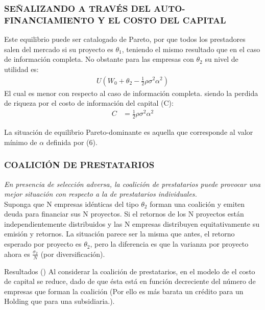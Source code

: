 \documentclass[10pt, xcolor=table, x11names]{beamer}
\begin{document}
\begin{frame}
    \frametitle{{\normalsize SEÑALIZANDO A TRAVÉS DEL AUTO-FINANCIAMIENTO Y EL COSTO DEL CAPITAL} {}}
        
    Este equilibrio puede ser catalogado de Pareto, por que todos los prestadores salen del mercado si su proyecto es $\theta_{1} $, teniendo el mismo resultado que en el caso de información completa. No obstante para las empresas con $\theta_{2} $ su nivel de utilidad es:
    \begin{align}
    U(W_{0}+\theta_{2}-\frac{1}{2}\rho \sigma^{2} \alpha^{2})\nonumber
    \end{align} 
    El cual es menor con respecto al caso de información completa. siendo la perdida de riqueza por el costo de información del capital (C):
    \begin{align}
    C&=\frac{1}{2}\rho \sigma^{2} \alpha^{2}\nonumber
    \end{align} 
    
    La situación de equilibrio Pareto-dominante es aquella que corresponde al valor mínimo de $\alpha$ definida por (6).
    
\end{frame}

\begin{frame}
    \frametitle{{\normalsize COALICIÓN DE PRESTATARIOS} {}}
    
    \textit{En presencia de selección adversa, la coalición de prestatarios puede provocar una mejor situación con respecto a la de prestatarios individuales.}\\
    
    Suponga que N empresas idénticas del tipo $\theta_{2}$ forman una coalición  y emiten deuda para financiar sus N proyectos. Si el retornos de los N proyectos están independientemente distribuidos y las N empresas distribuyen equitativamente su emisión y retornos. La situación parece ser la misma que antes, el retorno esperado por proyecto es $\theta_{2}$, pero la diferencia es que la varianza por proyecto ahora es $\frac{\sigma_{2}}{N}$ (por diversificación).\\
    
    \begin{block} {Resultados (\cite{Diamond1984})}
     Al considerar la coalición de prestatarios, en el modelo de \cite{Leland77} el costo de capital se reduce, dado de que ésta está en función decreciente del número de empresas que forman la coalición (Por ello es más barata un crédito para un Holding que para una subsidiaria.).     
    \end{block}	
    
    
\end{frame}
\end{document}
